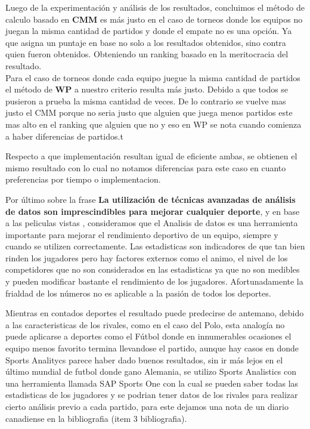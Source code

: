 Luego de la experimentación y análisis de los resultados, concluimos el método de calculo basado en \textbf{CMM} es m\'as justo en el 
caso de torneos donde los equipos no juegan la misma cantidad de partidos y donde el empate no es una opción. Ya que asigna un puntaje 
en base no solo a los resultados obtenidos, sino contra quien fueron obtenidos. Obteniendo un ranking basado en la meritocracia del resultado. \\

Para el caso de torneos donde cada equipo juegue la misma cantidad de partidos el método de \textbf{WP} a nuestro criterio resulta m\'as justo. 
Debido a que todos se pusieron a prueba la misma cantidad de veces. De lo contrario se vuelve mas justo el CMM porque no seria justo que alguien que juega menos partidos
este mas alto en el ranking que alguien que no y eso en WP se nota cuando comienza a haber diferencias de partidos.t

Respecto a que implementación resultan igual de eficiente ambas, se obtienen el mismo resultado con lo cual no notamos diferencias para este caso en cuanto
preferencias por tiempo o implementacion.

Por último sobre la frase \textbf{La utilización de técnicas avanzadas de análisis de datos son imprescindibles para mejorar cualquier deporte}, 
 y en base a las peliculas vistas , consideramos que el Analisis de datos es una herramienta importante para mejorar el rendimiento deportivo de un equipo, 
siempre y cuando se utilizen correctamente. 
Las estadisticas son indicadores de que tan bien rinden los jugadores pero hay factores externos como el animo, el nivel de los competidores 
que no son considerados en las estadisticas ya que no son medibles y pueden modificar bastante el rendimiento de los jugadores.
Afortunadamente la frialdad de los números no es aplicable a la pasión de todos los deportes. 

Mientras en contados deportes el resultado puede predecirse de antemano, debido a las caracteristicas de los rivales, como en el caso del Polo, 
esta analogía no puede aplicarse a deportes como el Fútbol donde en innumerables ocasiones el equipo menos favorito termina llevandose el partido, aunque hay casos en donde
Sports Analitycs parece haber dado buenos resultados, sin ir m\'as lejos en el \'ultimo mundial de futbol donde gano Alemania, se utilizo Sports Analistics
con una herramienta llamada SAP Sports One con la cual se pueden saber todas las estadisticas de los jugadores y se podrian tener datos de los rivales para realizar
cierto an\'alisis previo a cada partido, para este dejamos una nota de un diario canadiense en la bibliografia (item 3 bibliografia).
